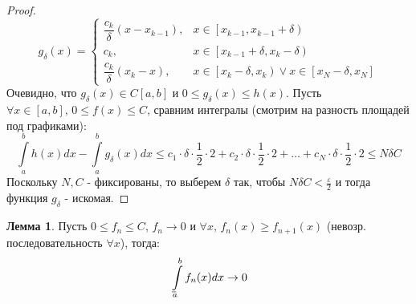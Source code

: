 \documentclass[12pt]{article}
\newcommand{\VE}{\varepsilon}
\theoremstyle{definition}
\newtheorem{lemma}{Лемма}
\newcommand{\ddint}[2]{\displaystyle\int\limits_{#1}^{#2}}
\def\lowint{\mkern3mu\underline{\vphantom{\intop}\mkern7mu}\mkern-10mu\int}
\begin{document}
\begin{proof}
	$$
		g_{\delta}(x) = 
		\begin{cases}
			\dfrac{c_k}{\delta}(x - x_{k-1}), &x \in  \left[x_{k-1}, x_{k-1}+\delta\right) \\[4pt]
			c_k, & x \in \left[x_{k-1} + \delta, x_k - \delta\right)\\[4pt]
			\dfrac{c_k}{\delta}(x_k - x ), & x \in \left[x_k - \delta, x_k\right) \vee x \in [x_{N} - \delta, x_N]
		\end{cases}
	$$
	Очевидно, что $g_\delta(x) \in C[a,b]$ и $0 \leq g_\delta(x) \leq h(x)$. Пусть $\forall x \in [a,b], \, 0 \leq f(x) \leq C$, сравним интегралы (смотрим на разность площадей под графиками):
	$$
		\ddint{a}{b}h(x)dx - \ddint{a}{b}g_\delta(x)dx \leq c_1{\cdot}\delta{\cdot}\dfrac{1}{2}{\cdot}2 + c_2{\cdot}\delta{\cdot}\dfrac{1}{2}{\cdot}2 + \dotsc +  c_N{\cdot}\delta{\cdot}\dfrac{1}{2}{\cdot}2 \leq N\delta C
	$$
	Поскольку $N,C$ - фиксированы, то выберем $\delta$ так, чтобы $N\delta C < \tfrac{\VE}{2}$ и тогда функция $g_\delta$ - искомая.
\end{proof}
\begin{lemma}
	Пусть $0 \leq f_n \leq C$, $f_n \to 0$ и $\forall x, \, f_n(x) \geq f_{n+1}(x)$ (невозр. последовательность $\forall x$), тогда:
	$$
		\lowint\limits_{a}^{b}f_n(x)dx \to 0
	$$ 
\end{lemma}
\end{document}
